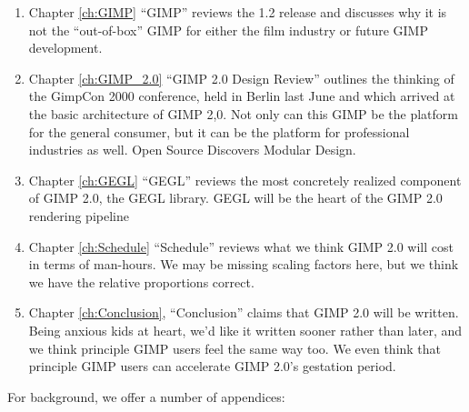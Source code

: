 \begin{enumerate}

\item Chapter \ref{ch:GIMP} ``GIMP'' reviews the 1.2 release and discusses
why it is not the ``out-of-box'' GIMP for either the film industry or 
future GIMP development. 

\item Chapter \ref{ch:GIMP_2.0} ``GIMP 2.0 Design Review'' outlines the thinking
of the GimpCon 2000 conference, held in Berlin last June  and which
arrived at the basic architecture of GIMP 2,0. Not only can this GIMP
be the platform for the general consumer, but it can be the platform for
professional industries as well. Open Source Discovers Modular Design.

\item Chapter \ref{ch:GEGL} ``GEGL'' reviews the most concretely realized 
component of GIMP 2.0, the GEGL library. GEGL will be the heart of
the GIMP 2.0 rendering pipeline 

\item Chapter \ref{ch:Schedule} ``Schedule'' reviews what we think GIMP 2.0
will cost in terms of man-hours. We may be missing scaling factors
here, but we think we have the relative proportions correct.

\item Chapter \ref{ch:Conclusion}, ``Conclusion'' claims that 
GIMP 2.0 will be written. Being anxious kids at heart, we'd like it
written sooner rather than later, and we think principle GIMP users
feel the same way too. We even think that principle GIMP users
can accelerate GIMP 2.0's gestation period.

\end{enumerate}

For background, we offer a number of appendices:

